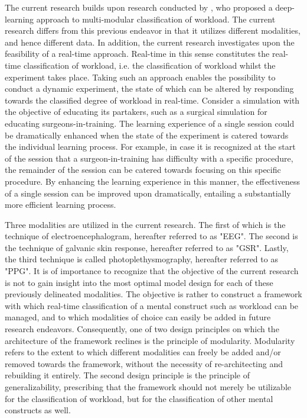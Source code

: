 \documentclass[12pt]{article}
\begin{document}
The current research builds upon research conducted by , who proposed a deep-learning approach to multi-modular classification of workload. The current research differs from this previous endeavor in that it utilizes different modalities, and hence different data. In addition, the current research investigates upon the feasibility of a real-time approach. Real-time in this sense constitutes the real-time classification of workload, i.e. the classification of workload whilst the experiment takes place. Taking such an approach enables the possibility to conduct a dynamic experiment, the state of which can be altered by responding towards the classified degree of workload in real-time. Consider a simulation with the objective of educating its partakers, such as a surgical simulation for educating surgeons-in-training. The learning experience of a single session could be dramatically enhanced when the state of the experiment is catered towards the individual learning process. For example, in case it is recognized at the start of the session that a surgeon-in-training has difficulty with a specific procedure, the remainder of the session can be catered towards focusing on this specific procedure. By enhancing the learning experience in this manner, the effectiveness of a single session can be improved upon dramatically, entailing a substantially more efficient learning process.

Three modalities are utilized in the current research. The first of which is the technique of electroencephalogram, hereafter referred to as "EEG". The second is the technique of galvanic skin response, hereafter referred to as "GSR". Lastly, the third technique is called photoplethysmography, hereafter referred to as "PPG". It is of importance to recognize that the objective of the current research is not to gain insight into the most optimal model design for each of these previously delineated modalities. The objective is rather to construct a framework with which real-time classification of a mental construct such as workload can be managed, and to which modalities of choice can easily be added in future research endeavors. Consequently, one of two design principles on which the architecture of the framework reclines is the principle of modularity. Modularity refers to the extent to which different modalities can freely be added and/or removed towards the framework, without the necessity of re-architecting and rebuilding it entirely. The second design principle is the principle of generalizability, prescribing that the framework should not merely be utilizable for the classification of workload, but for the classification of other mental constructs as well.
\end{document}
